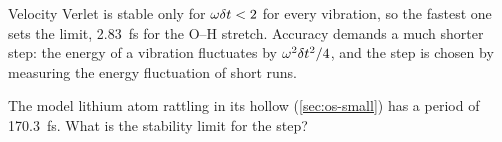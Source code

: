 \begin{keyidea}
Velocity Verlet is stable only for $\omega\delta t < 2$ for every vibration, so
the fastest one sets the limit, \SI{2.83}{\femto\second} for the O--H
stretch. Accuracy demands a much shorter step: the energy of a vibration
fluctuates by $\omega^2\delta t^2/4$, and the step is chosen by measuring the
energy fluctuation of short runs.
\end{keyidea}


\begin{selfcheck}
The model lithium atom rattling in its hollow (\cref{sec:os-small}) has a
period of \SI{170.3}{\femto\second}. What is the stability limit for the
step?
\end{selfcheck}
